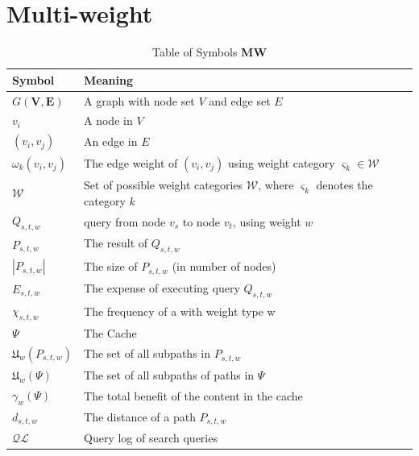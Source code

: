 \section{Multi-weight} \label{sec:intro}


\begin{table}
\begin{tabular*}{\columnwidth}{|l|p{}|}
\hline
\bf Symbol		& \bf Meaning \\\hline
$G\mathbf{(V,E)}$ 	& A graph with node set $V$ and edge set $E$ \\\hline 
$v_i$			& A node in $V$ \\\hline 
$(v_i,v_j)$		& An edge in $E$ \\\hline 
$\omega_k(v_i,v_j)$	& The edge weight of $(v_i,v_j)$ using weight category $\varsigma_k \in \mathcal{W}$ \\\hline
$\mathcal{W}$		& Set of possible weight categories $\mathcal{W}$, where $\varsigma_k$ denotes the category $k$ \\\hline

$Q_{s,t,w}$		& \spath query from node $v_s$ to node $v_t$, using weight $w$\\\hline
$P_{s,t,w}$		& The \spath result of $Q_{s,t,w}$ \\\hline
$|P_{s,t,w}|$		& The size of $P_{s,t,w}$ (in number of nodes) \\\hline
$E_{s,t,w}$		& The expense of executing query $Q_{s,t,w}$ \\\hline
$\chi_{s,t,w}$		& The frequency of a \spath with weight type w \\\hline
$\Psi$ 			& The Cache \\\hline
$\mathfrak{U}_w(P_{s,t,w})$& The set of all subpaths in $P_{s,t,w}$ \\\hline
$\mathfrak{U}_w(\Psi)$	& The set of all subpaths of paths in $\Psi$ \\\hline
$\gamma_w(\Psi)$		& The total benefit of the content in the cache \\\hline

$d_{s,t,w}$		& The \spath distance of a path $P_{s,t,w}$ \\\hline
$\mathcal{QL}$		& Query log of search queries \\\hline
\end{tabular*}
\caption{Table of Symbols \textbf{MW}}
\label{tab:symbols}
\end{table}

% 
% 
% 
% 
% 
% 
% 
% 
% 
% 


